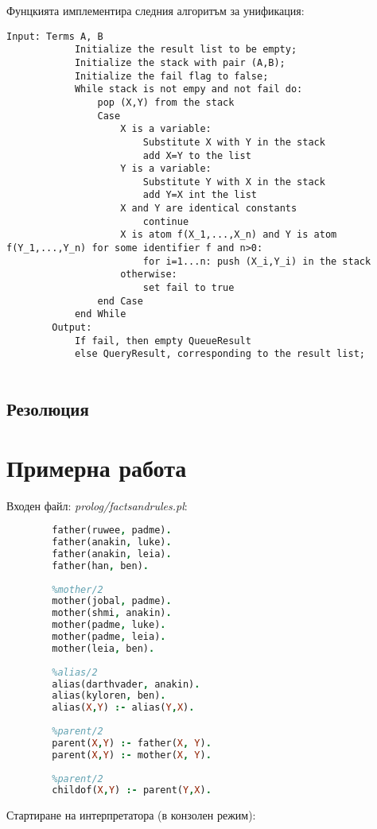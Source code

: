 \documentclass[15pt]{extarticle}
\begin{document}
	Фунцкията имплементира следния алгоритъм за унификация:
	
	\begin{lstlisting}[numbers=right]
	Input: Terms A, B
			Initialize the result list to be empty;
			Initialize the stack with pair (A,B);
			Initialize the fail flag to false;
			While stack is not empy and not fail do:
				pop (X,Y) from the stack
				Case
					X is a variable:
						Substitute X with Y in the stack
						add X=Y to the list
					Y is a variable:
						Substitute Y with X in the stack
						add Y=X int the list
					X and Y are identical constants 
						continue
					X is atom f(X_1,...,X_n) and Y is atom f(Y_1,...,Y_n) for some identifier f and n>0:
						for i=1...n: push (X_i,Y_i) in the stack
					otherwise:
						set fail to true
				end Case
			end While
		Output:
			If fail, then empty QueueResult
			else QueryResult, corresponding to the result list;
				
	\end{lstlisting}

	\subsection{Резолюция}
	
	\section{Примерна работа}
	
	Входен файл: \emph{prolog/factsandrules.pl}:
	
	\begin{lstlisting}[language=Prolog,numbers=right]
		%father/2
		father(ruwee, padme).
		father(anakin, luke).
		father(anakin, leia).
		father(han, ben).
		
		%mother/2
		mother(jobal, padme).
		mother(shmi, anakin).
		mother(padme, luke).
		mother(padme, leia).
		mother(leia, ben).
		
		%alias/2
		alias(darthvader, anakin).
		alias(kyloren, ben).
		alias(X,Y) :- alias(Y,X).
		
		%parent/2
		parent(X,Y) :- father(X, Y).
		parent(X,Y) :- mother(X, Y).
		
		%parent/2
		childof(X,Y) :- parent(Y,X).
	\end{lstlisting}
	
	Стартиране на интерпретатора (в конзолен режим):
	
\end{document}
